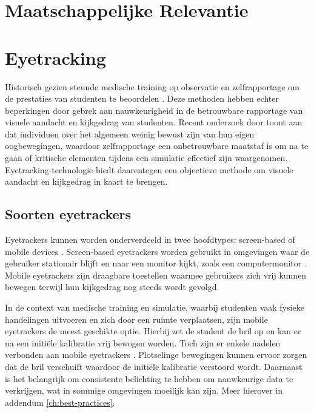 \section{Maatschappelijke Relevantie}


\section{Eyetracking}

Historisch gezien steunde medische training op observatie en zelfrapportage om de prestaties van studenten te beoordelen \autocite{Pauszek2023}. 
Deze methoden hebben echter beperkingen door gebrek aan nauwkeurigheid in de betrouwbare rapportage van visuele aandacht en kijkgedrag van studenten.
Recent onderzoek door \textcite{Clarke2017} toont aan dat individuen over het algemeen weinig bewust zijn van hun eigen oogbewegingen, 
waardoor zelfrapportage een onbetrouwbare maatstaf is om na te gaan of kritische elementen tijdens een simulatie effectief zijn waargenomen.
Eyetracking-technologie biedt daarentegen een objectieve methode om visuele aandacht en kijkgedrag in kaart te brengen. 

\subsection{Soorten eyetrackers}

Eyetrackers kunnen worden onderverdeeld in twee hoofdtypes: screen-based of mobile devices \autocite{Pauszek2023}.
Screen-based eyetrackers worden gebruikt in omgevingen waar de gebruiker stationair blijft en naar een monitor kijkt, zoals een computermonitor .
Mobile eyetrackers zijn draagbare toestellen waarmee gebruikers zich vrij kunnen bewegen terwijl hun kijkgedrag nog steeds wordt gevolgd.

In de context van medische training en simulatie, waarbij studenten vaak fysieke handelingen uitvoeren en zich door een ruimte verplaatsen, zijn mobile eyetrackers de meest geschikte optie.
Hierbij zet de student de bril op en kan er na een initiële kalibratie vrij bewogen worden.
Toch zijn er enkele nadelen verbonden aan mobile eyetrackers \autocite{Pauszek2023}. 
Plotselinge bewegingen kunnen ervoor zorgen dat de bril verschuift waardoor de initiële kalibratie verstoord wordt.
Daarnaast is het belangrijk om consistente belichting te hebben om nauwkeurige data te verkrijgen, wat in sommige omgevingen moeilijk kan zijn.
Meer hierover in addendum \ref{ch:best-practices}.

